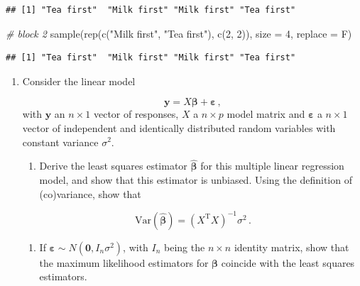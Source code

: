\documentclass[
]{book}
\newenvironment{Shaded}{\begin{snugshade}}{\end{snugshade}}
\newcommand{\AttributeTok}[1]{\textcolor[rgb]{0.77,0.63,0.00}{#1}}
\newcommand{\CommentTok}[1]{\textcolor[rgb]{0.56,0.35,0.01}{\textit{#1}}}
\newcommand{\DecValTok}[1]{\textcolor[rgb]{0.00,0.00,0.81}{#1}}
\newcommand{\FunctionTok}[1]{\textcolor[rgb]{0.00,0.00,0.00}{#1}}
\newcommand{\NormalTok}[1]{#1}
\newcommand{\StringTok}[1]{\textcolor[rgb]{0.31,0.60,0.02}{#1}}
\providecommand{\tightlist}{%
  \setlength{\itemsep}{0pt}\setlength{\parskip}{0pt}}
\theoremstyle{definition}
\theoremstyle{definition}
\theoremstyle{definition}
\theoremstyle{definition}
\theoremstyle{remark}
\begin{document}
\begin{enumerate}
\begin{verbatim}
## [1] "Tea first"  "Milk first" "Milk first" "Tea first"
\end{verbatim}

\begin{Shaded}
\begin{Highlighting}[]
\CommentTok{\# block 2}
\FunctionTok{sample}\NormalTok{(}\FunctionTok{rep}\NormalTok{(}\FunctionTok{c}\NormalTok{(}\StringTok{"Milk first"}\NormalTok{, }\StringTok{"Tea first"}\NormalTok{), }\FunctionTok{c}\NormalTok{(}\DecValTok{2}\NormalTok{, }\DecValTok{2}\NormalTok{)), }\AttributeTok{size =} \DecValTok{4}\NormalTok{, }\AttributeTok{replace =}\NormalTok{ F)}
\end{Highlighting}
\end{Shaded}

\begin{verbatim}
## [1] "Tea first"  "Milk first" "Milk first" "Tea first"
\end{verbatim}
\end{enumerate}

\begin{enumerate}
\def\labelenumi{\arabic{enumi}.}
\setcounter{enumi}{1}
\item
  Consider the linear model

  \[\boldsymbol{y}= X\boldsymbol{\beta}+ \boldsymbol{\varepsilon}\,,\]
  with \(\boldsymbol{y}\) an \(n\times 1\) vector of responses, \(X\) a \(n\times p\) model matrix and \(\boldsymbol{\varepsilon}\) a \(n\times 1\) vector of independent and identically distributed random variables with constant variance \(\sigma^2\).

  \begin{enumerate}
  \def\labelenumii{\alph{enumii}.}
  \tightlist
  \item
    Derive the least squares estimator \(\hat{\boldsymbol{\beta}}\) for this multiple linear regression model, and show that this estimator is unbiased. Using the definition of (co)variance, show that
  \end{enumerate}

  \[\mbox{Var}(\hat{\boldsymbol{\beta}}) = \left(X^{\mathrm{T}}X\right)^{-1}\sigma^2\,.\]

  \begin{enumerate}
  \def\labelenumii{\alph{enumii}.}
  \setcounter{enumii}{1}
  \tightlist
  \item
    If \(\boldsymbol{\varepsilon}\sim N (\boldsymbol{0},I_n\sigma^2)\), with \(I_n\) being the \(n\times n\) identity matrix, show that the maximum likelihood estimators for \(\boldsymbol{\beta}\) coincide with the least squares estimators.
  \end{enumerate}
\end{enumerate}
\end{document}
